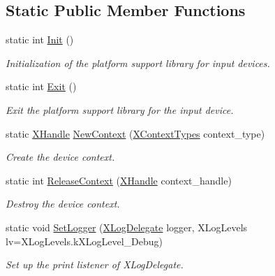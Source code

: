 \subsection*{Static Public Member Functions}
\begin{DoxyCompactItemize}
\item 
static int \mbox{\hyperlink{class_ximmerse_1_1_input_system_1_1_x_device_plugin_a546097299b4afcab3ca13db187b27f43}{Init}} ()
\begin{DoxyCompactList}\small\item\em Initialization of the platform support library for input devices. \end{DoxyCompactList}\item 
static int \mbox{\hyperlink{class_ximmerse_1_1_input_system_1_1_x_device_plugin_a3bf78828cba75d4f9ea2a53af67cd13b}{Exit}} ()
\begin{DoxyCompactList}\small\item\em Exit the platform support library for the input device. \end{DoxyCompactList}\item 
static \mbox{\hyperlink{class_ximmerse_1_1_input_system_1_1_x_device_plugin_1_1_x_handle}{X\+Handle}} \mbox{\hyperlink{class_ximmerse_1_1_input_system_1_1_x_device_plugin_a8388d5a956a6db84681f404a01e82640}{New\+Context}} (\mbox{\hyperlink{class_ximmerse_1_1_input_system_1_1_x_device_plugin_ab11d2f358709ce84ff419eae941f16d6}{X\+Context\+Types}} context\+\_\+type)
\begin{DoxyCompactList}\small\item\em Create the device context. \end{DoxyCompactList}\item 
static int \mbox{\hyperlink{class_ximmerse_1_1_input_system_1_1_x_device_plugin_a2bc3bfc01379e786800b8280ba34765b}{Release\+Context}} (\mbox{\hyperlink{class_ximmerse_1_1_input_system_1_1_x_device_plugin_1_1_x_handle}{X\+Handle}} context\+\_\+handle)
\begin{DoxyCompactList}\small\item\em Destroy the device context. \end{DoxyCompactList}\item 
static void \mbox{\hyperlink{class_ximmerse_1_1_input_system_1_1_x_device_plugin_a95d719f976001f91b79be34041aaeb43}{Set\+Logger}} (\mbox{\hyperlink{class_ximmerse_1_1_input_system_1_1_x_device_plugin_ad3e594d2625a689603878102ad019899}{X\+Log\+Delegate}} logger, X\+Log\+Levels lv=X\+Log\+Levels.\+k\+X\+Log\+Level\+\_\+\+Debug)
\begin{DoxyCompactList}\small\item\em Set up the print listener of X\+Log\+Delegate. \end{DoxyCompactList}\item 

\end{DoxyCompactItemize}
